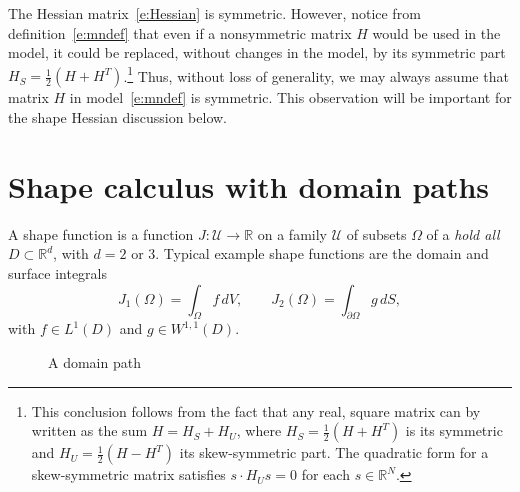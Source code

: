\documentclass{article}
\theoremstyle{remark}
\numberwithin{equation}{section}
\newcommand{\RR}{\mathbb{R}}
\begin{document}
%
The Hessian matrix~\eqref{e:Hessian} is symmetric.
However, notice from definition~\eqref{e:mndef} that even if a nonsymmetric matrix $H$ would be used in the model, it could be replaced, without changes in the model, by its symmetric part $H_S = \frac12(H + H^T)$.\footnote{This conclusion follows from the fact that any real, square matrix can by written as the sum  $H = H_S + H_U$, where $H_S = \frac12(H + H^T)$ is its symmetric and $H_U =\frac12(H - H^T)$ its skew-symmetric part.
The quadratic form for a skew-symmetric matrix satisfies $s\cdot H_Us = 0$ for each $s\in\RR^N$.}
Thus, without loss of generality, we may always assume that matrix $H$ in model~\eqref{e:mndef} is symmetric.  
This observation will be important for the shape Hessian discussion below.

\section{Shape calculus with domain paths}

A shape function is a function $J:\mathcal U\to\RR$ on a family $\mathcal U$ of subsets $\Omega$ of a \textit{hold all} $D\subset\RR^d$, with $d=2$ or 3.
Typical example shape functions  are the domain and surface integrals
%
\begin{equation}\label{e:J1J2}
J_1(\Omega) = \int_\Omega f\,\mathit{dV},
\qquad
J_2(\Omega) = \int_{\partial\Omega} g\,\mathit{dS},
\end{equation}
%
with $f\in L^1(D)$ and $g\in W^{1,1}(D)$. 

\begin{figure}\label{f:domainpath}
\centering
{}
\caption{A domain path}
\end{figure}
\end{document}
